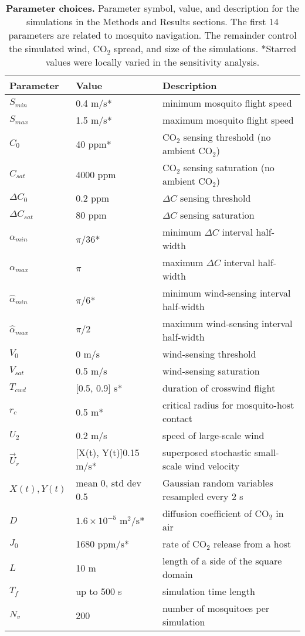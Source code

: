 \documentclass[10pt]{article}
\begin{document}
\begin{table}[!htp]
\caption{
{\bf Parameter choices.} Parameter symbol, value, and description for the simulations in the Methods and Results sections. The first 14 parameters are related to mosquito navigation. The remainder control the simulated wind, $\mbox{CO}_2$ spread, and size of the simulations. *Starred values were locally varied in the sensitivity analysis. }
	\begin{center}
		\begin{tabular}{|lll|}
			\hline
			Parameter & Value & Description \\
			\hline
			$S_{min}$ & 0.4 m/s* & minimum mosquito flight speed\\
			$S_{max}$ &  1.5 m/s* & maximum mosquito flight speed\\
			$C_0$ & 40 ppm* & $\mbox{CO}_2$ sensing threshold (no ambient $\mbox{CO}_2$)\\
			$C_{sat}$ & 4000 ppm & $\mbox{CO}_2$ sensing saturation (no ambient $\mbox{CO}_2$)\\
			$\Delta C_0$ & 0.2 ppm & $\Delta C$ sensing threshold\\
			$\Delta C_{sat}$ &  80 ppm & $\Delta C$ sensing saturation\\
			$\alpha_{min}$  & $\pi/36$* & minimum $\Delta C$ interval half-width \\
			$\alpha_{max}$   & $\pi$ & maximum $\Delta C$ interval half-width\\
			$\hat{\alpha}_{min}$ & $\pi/6$* & minimum wind-sensing interval half-width \\
			$\hat{\alpha}_{max}$ & $\pi/2$ & maximum wind-sensing interval half-width \\
			$V_0$ &  0 m/s & wind-sensing threshold\\
			$V_{sat}$ & 0.5 m/s & wind-sensing saturation\\
			$T_{cwd}$ & [0.5, 0.9] s*& duration of crosswind flight  \\
			$r_c$ & 0.5 m* & critical radius for mosquito-host contact  \\
			$U_2$  & 0.2 m/s & speed of large-scale wind\\
			$\vec{U}_r$  & [X(t), Y(t)]0.15 m/s* & superposed stochastic small-scale wind velocity \\
			$X(t),Y(t)$ & mean 0, std dev 0.5 & Gaussian random variables resampled every 2 s\\
			$D$ & $1.6\times 10^{-5}\mbox{ m}^2/\mbox{s}$*& diffusion coefficient of $\mbox{CO}_2$ in air \\
			$J_0$ & 1680 ppm/s* & rate of $\mbox{CO}_2$ release from a host \\
			$L$ & 10 m & length of a side of the square domain \\
			$T_f$ & up to 500 s & simulation time length\\
			$N_v$ & 200 & number of mosquitoes per simulation \\
			\hline
		\end{tabular}
	\end{center}\label{tab:finalparams}
\end{table}
\end{document}
